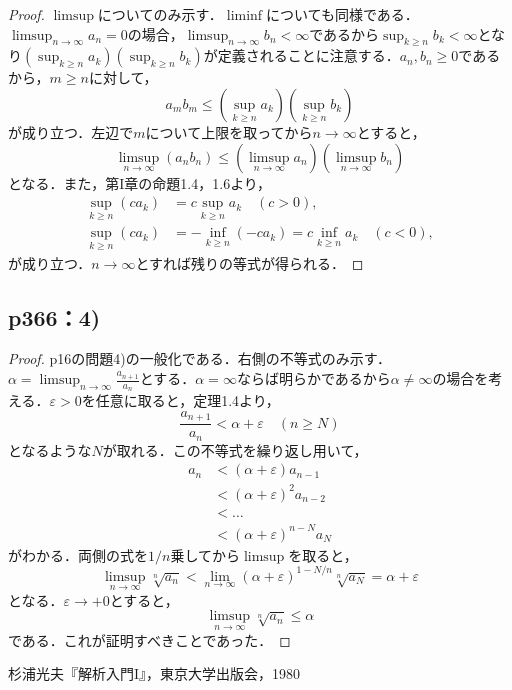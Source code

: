 \documentclass[uplatex,dvipdfmx,a4paper,10pt,fleqn]{jsarticle}
\begin{document}
  \begin{leftbar}
    \begin{proof}
      $\limsup$についてのみ示す．$\liminf$についても同様である．
      $\limsup_{n \to \infty} a_n = 0$の場合，$\limsup_{n \to \infty} b_n < \infty$であるから$\sup_{k \geq n} b_k < \infty$となり$\left(\sup _{k \geq n} a_k\right) \left(\sup _{k \geq n} b_k\right)$が定義されることに注意する．$a_n, b_n \geq 0$であるから，$m \geq n$に対して，
      \[
        a_m b_m \leq \left(\sup _{k \geq n} a_k\right) \left(\sup _{k \geq n} b_k\right)
      \]
      が成り立つ．左辺で$m$について上限を取ってから$n \to \infty$とすると，
      \[
        \limsup_{n \to \infty} (a_n b_n) \leq \left(\limsup _{n \to \infty} a_n\right) \left(\limsup_{n \to \infty} b_n\right)
      \]
      となる．また，第I章の命題1.4，1.6より，
      \begin{align*}
        \sup_{k \geq n} (c a_k) &= c\sup_{k \geq n} a_k \quad (c > 0), \\
        \sup_{k \geq n} (c a_k) &= -\inf_{k \geq n} (-c a_k) = c\inf_{k \geq n} a_k \quad (c < 0),
      \end{align*}
      が成り立つ．$n \to \infty$とすれば残りの等式が得られる．
    \end{proof}
  \end{leftbar}

  \subsection*{p366：4)}

  \begin{leftbar}
    \begin{proof}
      p16の問題4)の一般化である．右側の不等式のみ示す．
      $\alpha = \limsup _{n \to \infty} \frac{a_{n+1}}{a_{n}}$とする．$\alpha = \infty$ならば明らかであるから$\alpha \neq \infty$の場合を考える．$\varepsilon > 0$を任意に取ると，定理1.4より，
      \[
        \frac{a_{n+1}}{a_{n}} < \alpha + \varepsilon \quad (n \geq N)
      \]
      となるような$N$が取れる．この不等式を繰り返し用いて，
      \begin{align*}
        a_n
        &< (\alpha + \varepsilon) a_{n-1} \\
        &< (\alpha + \varepsilon)^2 a_{n-2} \\
        &< \ldots \\
        &< (\alpha + \varepsilon)^{n-N} a_N
      \end{align*}
      がわかる．両側の式を$1/n$乗してから$\limsup$を取ると，
      \[
        \limsup _{n \to \infty} \sqrt[n]{a_n} < \lim _{n \to \infty} (\alpha + \varepsilon)^{1-N/n} \sqrt[n]{a_N} = \alpha + \varepsilon 
      \]
      となる．$\varepsilon \to +0$とすると，
      \[
        \limsup _{n \to \infty} \sqrt[n]{a_n} \leq \alpha
      \]
      である．これが証明すべきことであった．
    \end{proof}
  \end{leftbar}

\newpage 

\begin{thebibliography}{9}
	 杉浦光夫『解析入門I』，東京大学出版会，1980
\end{thebibliography}
\end{document}
